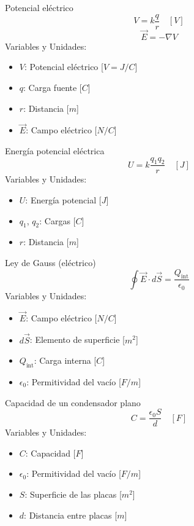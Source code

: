 \documentclass{article}
\begin{document}
\begin{multicols}{3}
\begin{teorema}{Potencial eléctrico}
    $$V = k\frac{q}{r} \quad [V]$$
    $$\vec{E} = -\nabla V$$
    Variables y Unidades:
    \begin{itemize}
        \item $V$: Potencial eléctrico [$V = J/C$]
        \item $q$: Carga fuente [$C$]
        \item $r$: Distancia [$m$]
        \item $\vec{E}$: Campo eléctrico [$N/C$]
    \end{itemize}
\end{teorema}

\begin{teorema}{Energía potencial eléctrica}
    $$U = k\frac{q_1 q_2}{r} \quad [J]$$
    Variables y Unidades:
    \begin{itemize}
        \item $U$: Energía potencial [$J$]
        \item $q_1$, $q_2$: Cargas [$C$]
        \item $r$: Distancia [$m$]
    \end{itemize}
\end{teorema}

\columnbreak

\begin{teorema}{Ley de Gauss (eléctrico)}
    $$\oint \vec{E} \cdot d\vec{S} = \frac{Q_{\text{int}}}{\epsilon_0}$$
    Variables y Unidades:
    \begin{itemize}
        \item $\vec{E}$: Campo eléctrico [$N/C$]
        \item $d\vec{S}$: Elemento de superficie [$m^2$]
        \item $Q_{\text{int}}$: Carga interna [$C$]
        \item $\epsilon_0$: Permitividad del vacío [$F/m$]
    \end{itemize}
\end{teorema}

\begin{teorema}{Capacidad de un condensador plano}
    $$C = \frac{\epsilon_0 S}{d} \quad [F]$$
    Variables y Unidades:
    \begin{itemize}
        \item $C$: Capacidad [$F$]
        \item $\epsilon_0$: Permitividad del vacío [$F/m$]
        \item $S$: Superficie de las placas [$m^2$]
        \item $d$: Distancia entre placas [$m$]
    \end{itemize}
\end{teorema}


\end{multicols}
\end{document}
